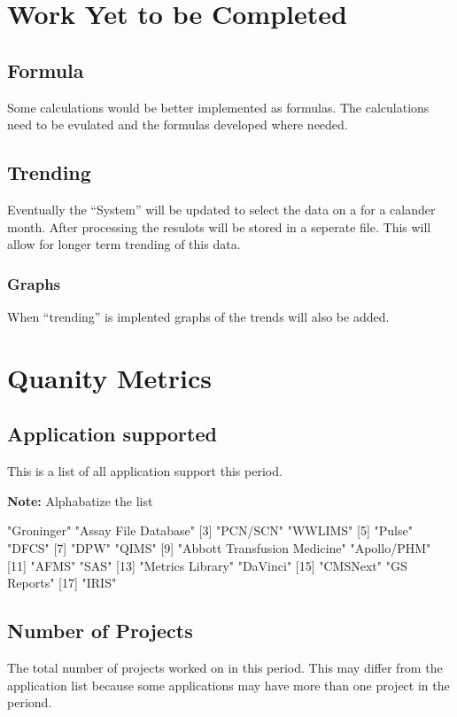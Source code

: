 \documentclass{article}
\begin{document}
\section{Work Yet to be Completed}
\subsection{Formula}
Some calculations would be better implemented as formulas. The calculations need
to be evulated and the formulas developed where needed.
\subsection{Trending}
Eventually the ``System'' will be updated to select the data on a for a calander
month. After processing the resulots will be stored in a seperate file.
This will allow for longer term trending of this data.
\subsubsection{Graphs}
When ``trending'' is implented graphs of the trends will also be added.


\section{Quanity Metrics}
\subsection{Application supported}
This is a list of all application support this period.

\textbf{Note:} Alphabatize the list

\begin{Schunk}
\begin{Soutput}
 [1] "Groninger"                   "Assay File Database"        
 [3] "PCN/SCN"                     "WWLIMS"                     
 [5] "Pulse"                       "DFCS"                       
 [7] "DPW"                         "QIMS"                       
 [9] "Abbott Transfusion Medicine" "Apollo/PHM"                 
[11] "AFMS"                        "SAS"                        
[13] "Metrics Library"             "DaVinci"                    
[15] "CMSNext"                     "GS Reports"                 
[17] "IRIS"                       
\end{Soutput}
\end{Schunk}

\subsection{Number of Projects}
The total number of  projects worked on in this period. This may differ from the
application list because some applications may have more than one project in
the periond.
\end{document}
